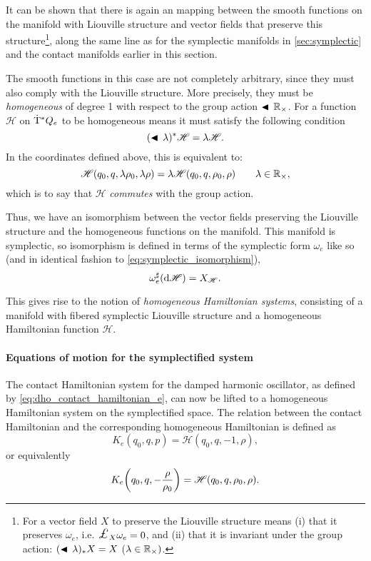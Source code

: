 It can be shown that there is again an mapping between the smooth functions on the manifold with Liouville structure and vector fields that preserve this structure\footnote
{For a vector field $X$ to preserve the Liouville structure means (i) that it preserves $\omega_e$, i.e. $\lied{X}{\omega_e} = 0$, and (ii) that it is invariant under the group action: $ (\blacktriangleleft\,\lambda)_* X = X$ ($\lambda \in \mathbb{R}_{\times})$. }, along the same line as for the symplectic manifolds in \cref{sec:symplectic} and the contact manifolds earlier in this section.

The smooth functions in this case are not completely arbitrary, since they must also comply with the Liouville structure. More precisely, they must be \emph{homogeneous} of degree 1 with respect to the group action $\blacktriangleleft\,\mathbb{R}_{\times}$. For a function $\mathscr{H}$ on $\mathrm{\dot{T}}^*Q_e$ to be homogeneous means it must satisfy the following condition
$$ (\blacktriangleleft\,\lambda )^* \mathscr{H} = \lambda \mathscr{H}. $$
In the coordinates defined above, this is equivalent to:
$$ \mathscr{H}(q_0, q, \lambda \rho_0, \lambda \rho) = \lambda\mathscr{H}(q_0, q, \rho_0, \rho) \qquad \lambda \in \mathbb{R}_{\times},$$
which is to say that $\mathscr{H}$ \emph{commutes} with the group action.

Thus, we have an isomorphism between the vector fields preserving the Liouville structure and the homogeneous functions on the manifold. 
This manifold is symplectic, so isomorphism is defined in terms of the symplectic form $\omega_e$ like so (and in identical fashion to \cref{eq:symplectic_isomorphism}),
$$ \omega_e^\sharp(\dd{\mathscr{H}}) = X_\mathscr{H}. $$

This gives rise to the notion of \emph{homogeneous Hamiltonian systems}, consisting of a manifold with fibered symplectic Liouville structure and a homogeneous Hamiltonian function $\mathscr{H}$.

\paragraph{Equations of motion for the symplectified system} The contact Hamiltonian system for the damped harmonic oscillator, as defined by \cref{eq:dho_contact_hamiltonian_e}, can now be lifted to a homogeneous Hamiltonian system on the symplectified space. The relation between the contact Hamiltonian and the corresponding homogeneous Hamiltonian is defined as \cite{VanderSchaft2021a,Libermann1987,Arnold1989}
$$ K_e(q_0, q, p) = \mathscr{H}(q_0, q, -1, \rho), $$
or equivalently
\begin{equation}
    K_e\qty(q_0, q, -\frac{\rho}{\rho_0}) = \mathscr{H}(q_0, q, \rho_0, \rho). 
    \label{eq:H_contact_homo}
\end{equation}

